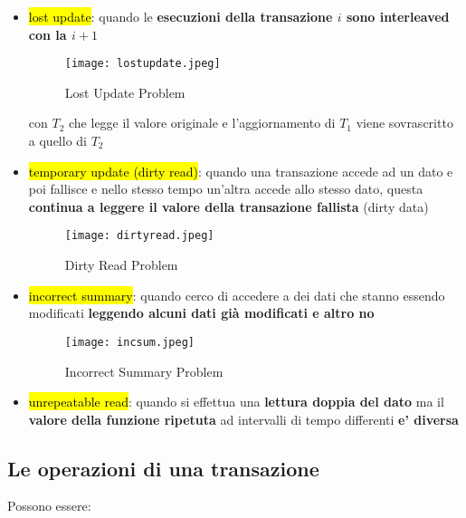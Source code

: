 \begin{itemize}
    \item \hl{lost update}: quando le \textbf{esecuzioni della transazione $i$ sono interleaved con la $i+1$}
   

    \begin{figure}[H]
    \centering
    \texttt{[image: lostupdate.jpeg]}
    \caption{Lost Update Problem} 
    \label{lostupdate}
    \end{figure}

    con $T_2$ che legge il valore originale e l'aggiornamento di $T_1$ viene sovrascritto a quello di $T_2$
    
    
    \item \hl{temporary update (dirty read)}: quando una transazione accede ad un dato e poi fallisce e nello stesso tempo un'altra accede allo stesso dato, questa \textbf{continua a leggere il valore della transazione fallista} (dirty data)
    
    \begin{figure}[H]
    \centering
    \texttt{[image: dirtyread.jpeg]}
    \caption{Dirty Read Problem} 
    \label{dirtyread}
    \end{figure}


    \item \hl{incorrect summary}: quando cerco di accedere a dei dati che stanno essendo modificati \textbf{leggendo alcuni dati già modificati e altro no}
    
    \begin{figure}[H]
    \centering
    \texttt{[image: incsum.jpeg]}
    \caption{Incorrect Summary Problem} 
    \label{incsum}
    \end{figure}


    \item \hl{unrepeatable read}: quando si effettua una \textbf{lettura doppia del dato} ma il \textbf{valore della funzione ripetuta} ad intervalli di tempo differenti \textbf{e' diversa}
\end{itemize}


\subsection{Le operazioni di una transazione}

Possono essere:

